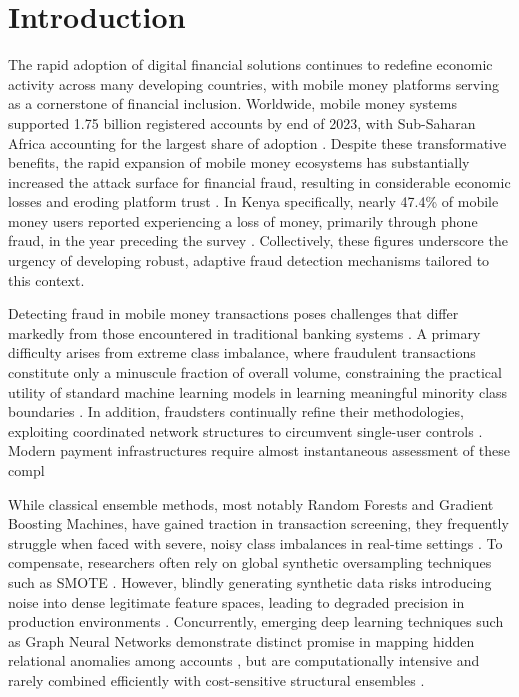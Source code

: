 \documentclass[a4paper,fleqn]{cas-sc}
\begin{document}
\maketitle

\section{Introduction}
The rapid adoption of digital financial solutions continues to redefine economic activity across many developing countries, with mobile money platforms serving as a cornerstone of financial inclusion. Worldwide, mobile money systems supported 1.75 billion registered accounts by end of 2023, with Sub-Saharan Africa accounting for the largest share of adoption \cite{GSMA_SOTIR_2024}. Despite these transformative benefits, the rapid expansion of mobile money ecosystems has substantially increased the attack surface for financial fraud, resulting in considerable economic losses and eroding platform trust \cite{Azamuke2025Financial}. In Kenya specifically, nearly 47.4\% of mobile money users reported experiencing a loss of money, primarily through phone fraud, in the year preceding the survey \cite{finaccess2021household}. Collectively, these figures underscore the urgency of developing robust, adaptive fraud detection mechanisms tailored to this context.

Detecting fraud in mobile money transactions poses challenges that differ markedly from those encountered in traditional banking systems \cite{Azamuke2025Financial}. A primary difficulty arises from extreme class imbalance, where fraudulent transactions constitute only a minuscule fraction of overall volume, constraining the practical utility of standard machine learning models in learning meaningful minority class boundaries \cite{imbalanced1}. In addition, fraudsters continually refine their methodologies, exploiting coordinated network structures to circumvent single-user controls \cite{George2023Systematic}. Modern payment infrastructures require almost instantaneous assessment of these compl

While classical ensemble methods, most notably Random Forests and Gradient Boosting Machines, have gained traction in transaction screening, they frequently struggle when faced with severe, noisy class imbalances in real-time settings \cite{frontiersfrai2025}. To compensate, researchers often rely on global synthetic oversampling techniques such as SMOTE \cite{Hanbali2025MobileMoneyFraud}. However, blindly generating synthetic data risks introducing noise into dense legitimate feature spaces, leading to degraded precision in production environments \cite{Bonde2025Improving}. Concurrently, emerging deep learning techniques such as Graph Neural Networks demonstrate distinct promise in mapping hidden relational anomalies among accounts \cite{cheng2025graph}, but are computationally intensive and rarely combined efficiently with cost-sensitive structural ensembles \cite{kungu2026hybrid}.
\end{document}

